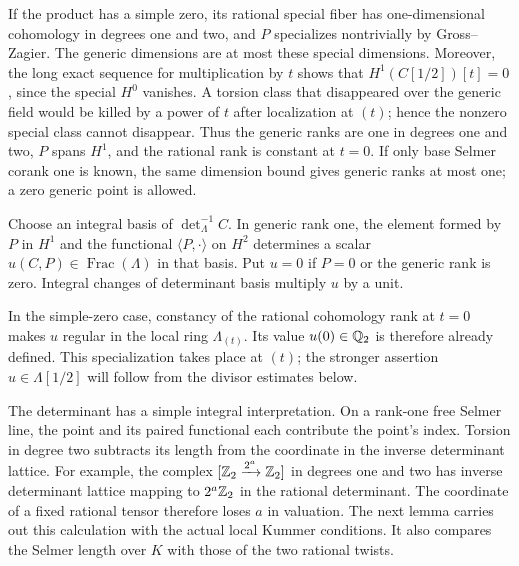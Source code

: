 If the product has a simple zero, its rational special fiber has
one-dimensional cohomology in degrees one and two, and $P$ specializes
nontrivially by Gross--Zagier. The generic dimensions are at most these
special dimensions. Moreover, the long exact sequence for multiplication
by $t$ shows that $H^1(C[1/2])[t]=0$, since the special $H^0$ vanishes.
A torsion class that disappeared over the generic field would be killed
by a power of $t$ after localization at $(t)$; hence the nonzero special
class cannot disappear. Thus the generic ranks are one in degrees one
and two, $P$ spans $H^1$, and the rational rank is constant at $t=0$.
If only base Selmer corank one is known, the same dimension bound gives
generic ranks at most one; a zero generic point is allowed.

\begin{definition}\label{def:h:determinant-coordinate}
Choose an integral basis of $\det^{-1}_{\Lambda}C$. In generic rank one,
the element formed by $P$ in $H^1$ and the functional
$\langle P,\cdot\rangle$ on $H^2$ determines a scalar
$u(C,P)\in\operatorname{Frac}(\Lambda)$ in that basis. Put $u=0$ if
$P=0$ or the generic rank is zero. Integral changes of determinant basis
multiply $u$ by a unit.
\end{definition}

In the simple-zero case, constancy of the rational cohomology rank at
$t=0$ makes $u$ regular in the local ring $\Lambda_{(t)}$. Its value
$u(0)\in\mathbb Q_2$ is therefore already defined. This specialization takes
place at $(t)$; the stronger assertion $u\in\Lambda[1/2]$ will follow
from the divisor estimates below.

The determinant has a simple integral interpretation. On a rank-one
free Selmer line, the point and its paired functional each contribute
the point's index. Torsion in degree two subtracts its length from the
coordinate in the inverse determinant lattice. For example, the complex
$[\mathbb Z_2\xrightarrow{2^a}\mathbb Z_2]$ in degrees one and two has inverse
determinant lattice mapping to $2^a\mathbb Z_2$ in
the rational determinant. The coordinate of a fixed rational tensor
therefore loses $a$ in valuation. The next lemma carries out this
calculation with the actual local Kummer conditions. It also compares
the Selmer length over $K$ with those of the two rational twists.

